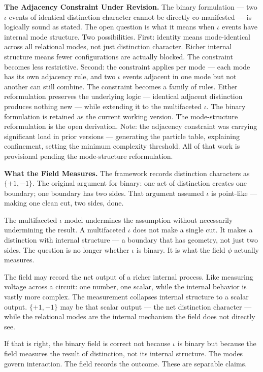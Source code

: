 \documentclass[11pt,letterpaper]{article}
\begin{document}
\textbf{The Adjacency Constraint Under Revision.} The binary formulation — two \(\iota\) events of identical distinction character cannot be directly co-manifested --- is logically sound as stated. The open question is what it means when \(\iota\) events have internal mode structure. Two possibilities. First: identity means mode-identical across all relational modes, not just distinction character. Richer internal structure means fewer configurations are actually blocked. The constraint becomes less restrictive. Second: the constraint applies per mode — each mode has its own adjacency rule, and two \(\iota\) events adjacent in one mode but not another can still combine. The constraint becomes a family of rules. Either reformulation preserves the underlying logic — identical adjacent distinction produces nothing new --- while extending it to the multifaceted \(\iota\). The binary formulation is retained as the current working version. The mode-structure reformulation is the open derivation. Note: the adjacency constraint was carrying significant load in prior versions --- generating the particle table, explaining confinement, setting the minimum complexity threshold. All of that work is provisional pending the mode-structure reformulation.

\textbf{What the Field Measures.} The framework records distinction characters as \(\{+1,-1\}\). The original argument for binary: one act of distinction creates one boundary; one boundary has two sides. That argument assumed \(\iota\) is point-like --- making one clean cut, two sides, done.

The multifaceted \(\iota\) model undermines the assumption without necessarily undermining the result. A multifaceted \(\iota\) does not make a single cut. It makes a distinction with internal structure --- a boundary that has geometry, not just two sides. The question is no longer whether \(\iota\) is binary. It is what the field \(\phi\) actually measures.

The field may record the net output of a richer internal process. Like measuring voltage across a circuit: one number, one scalar, while the internal behavior is vastly more complex. The measurement collapses internal structure to a scalar output. \(\{+1,-1\}\) may be that scalar output --- the net distinction character --- while the relational modes are the internal mechanism the field does not directly see.

If that is right, the binary field is correct not because \(\iota\) is binary but because the field measures the result of distinction, not its internal structure. The modes govern interaction. The field records the outcome. These are separable claims.
\end{document}
